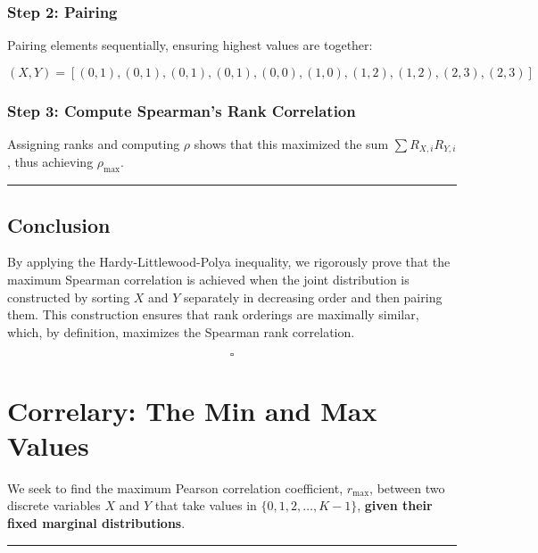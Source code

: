 \documentclass[
  12pt,
  letterpaper,
  DIV=11,
  numbers=noendperiod]{scrartcl}
\begin{document}
\subsubsection{\texorpdfstring{\textbf{Step 2:
Pairing}}{Step 2: Pairing}}\label{step-2-pairing}

Pairing elements sequentially, ensuring highest values are together:

\[(X,Y) = [(0,1), (0,1), (0,1), (0,1), (0,0), (1,0), (1,2), (1,2), (2,3), (2,3)]\]

\subsubsection{\texorpdfstring{\textbf{Step 3: Compute Spearman's Rank
Correlation}}{Step 3: Compute Spearman's Rank Correlation}}\label{step-3-compute-spearmans-rank-correlation}

Assigning ranks and computing \(\rho\) shows that this maximized the sum
\(\sum R_{X,i} R_{Y,i}\), thus achieving \(\rho_{\max}\).

\begin{center}\rule{0.5\linewidth}{0.5pt}\end{center}

\subsection{\texorpdfstring{\textbf{Conclusion}}{Conclusion}}\label{conclusion}

By applying the Hardy-Littlewood-Polya inequality, we rigorously prove
that the maximum Spearman correlation is achieved when the joint
distribution is constructed by sorting \(X\) and \(Y\) separately in
decreasing order and then pairing them. This construction ensures that
rank orderings are maximally similar, which, by definition, maximizes
the Spearman rank correlation.

\[\square\]

\section{Correlary: The Min and Max
Values}\label{correlary-the-min-and-max-values}

We seek to find the maximum Pearson correlation coefficient,
\(r_{\max}\), between two discrete variables \(X\) and \(Y\) that take
values in \(\{0,1,2, \dots, K-1\}\), \textbf{given their fixed marginal
distributions}.

\begin{center}\rule{0.5\linewidth}{0.5pt}\end{center}
\end{document}
